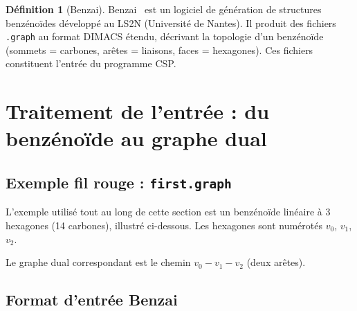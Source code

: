 \documentclass[12pt,a4paper]{article}
\theoremstyle{definition}
\newtheorem{definition}{Définition}[section]
\begin{document}
\begin{definition}[Benzai]
  Benzai~\cite{benzai} est un logiciel de génération de structures benzénoïdes développé au
  LS2N (Université de Nantes). Il produit des fichiers \texttt{.graph} au format DIMACS étendu,
  décrivant la topologie d'un benzénoïde (sommets = carbones, arêtes = liaisons, faces =
  hexagones). Ces fichiers constituent l'entrée du programme CSP.
\end{definition}

\section{Traitement de l'entrée : du benzénoïde au graphe dual}

\subsection{Exemple fil rouge : \texttt{first.graph}}

L'exemple utilisé tout au long de cette section est un benzénoïde linéaire à 3 hexagones
(14 carbones), illustré ci-dessous. Les hexagones sont numérotés $v_0$, $v_1$, $v_2$.

\begin{center}
\end{center}

Le graphe dual correspondant est le chemin $v_0 - v_1 - v_2$ (deux arêtes).

\subsection{Format d'entrée Benzai}
\end{document}
